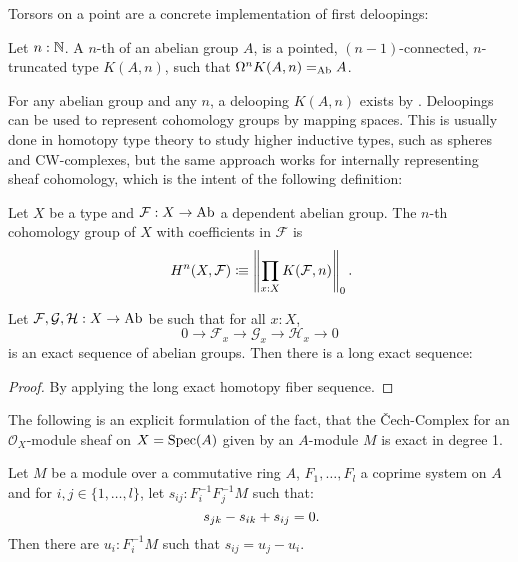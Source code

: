 Torsors on a point are a concrete implementation of first deloopings:

\begin{definition}
  \label{delooping}
  Let $n:\mathbb{N}$.
  A $n$-th  of an abelian group $A$,
  is a pointed, $(n-1)$-connected, $n$-truncated type $K(A,n)$,
  such that $\Omega^nK(A,n)=_{\operatorname{Ab}}A$.
\end{definition}

For any abelian group and any $n$, a delooping $K(A,n)$ exists by \cite{licata-finster}.
Deloopings can be used to represent cohomology groups by mapping spaces.
This is usually done in homotopy type theory to study higher inductive types, such as spheres and CW-complexes,
but the same approach works for internally representing sheaf cohomology,
which is the intent of the following definition:

\begin{definition}
  \label{cohomology}
  Let $X$ be a type and $\mathcal F:X\to\operatorname{Ab}$ a dependent abelian group.
  The $n$-th cohomology group of $X$ with coefficients in $\mathcal F$ is
  \[
    H^n(X,\mathcal F)\colonequiv \left\propTrunc{\prod_{x:X}K(\mathcal F,n)\right}_0\rlap{.}
  \]
\end{definition}

\begin{theorem}%
  \label{cohomology-les}
  Let $\mathcal F,\mathcal G,\mathcal H:X\to \operatorname{Ab}$ be such that for all $x:X$,
  \[
    0\to \mathcal F_x\to\mathcal G_x\to\mathcal H_x\to 0
  \]
  is an exact sequence of abelian groups. Then there is a long exact sequence:
  \begin{center}
  \end{center}
\end{theorem}

\begin{proof}
  By applying the long exact homotopy fiber sequence.
\end{proof}

The following is an explicit formulation of the fact, that the Čech-Complex for an
$\mathcal{O}_X$-module sheaf on $X=\operatorname{Spec}(A)$ given by an $A$-module $M$ is exact in degree 1.
\begin{lemma}%
  \label{H1-algebra}
  Let $M$ be a module over a commutative ring $A$, $F_1,\dots,F_l$ a coprime system on $A$
  and for $i,j\in\{1,\dots,l\}$, let $s_{ij} : F_i^{-1} F_j^{-1} M$ such that:
  \[ s_{jk}-s_{ik}+s_{ij}=0 \rlap{.}\]
  Then there are $u_i:F_i^{-1}M$ such that $s_{ij}=u_j - u_i$.
\end{lemma}

